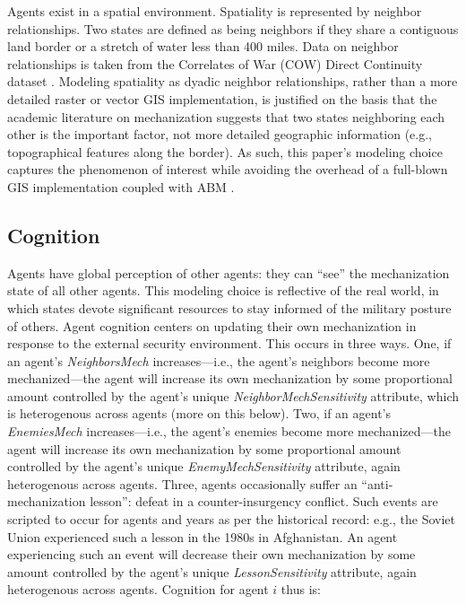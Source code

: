 \documentclass{article}
\begin{document}
Agents exist in a spatial environment. Spatiality is represented by neighbor
relationships. Two states are defined as
being neighbors if they share a contiguous land border or a stretch of water
less than 400 miles. Data on neighbor relationships is taken from the Correlates
of War (COW) Direct Continuity dataset \citep{cow_contiguity}.
Modeling spatiality as dyadic neighbor relationships, rather than a more
detailed raster or vector GIS implementation, is justified on the basis that the
academic literature on mechanization suggests that two states neighboring each
other is the important factor, not more detailed geographic information (e.g.,
topographical features along the border). As such, this paper's modeling choice
captures the phenomenon of interest while avoiding the overhead of a full-blown
GIS implementation coupled with ABM \citep[e.g.][]{harper2002modeling,bennett2006modelling}.

\subsection{Cognition}

Agents have global perception of other agents: they can ``see'' the
mechanization state of all other agents. This modeling choice is reflective of
the real world, in which states devote significant resources to stay informed of
the military posture of others. Agent cognition centers on 
updating their own mechanization in response to the external security
environment. This occurs in three ways. One, if an agent's
\textit{NeighborsMech} increases---i.e., the agent's neighbors become more
mechanized---the agent will increase its own mechanization by some proportional
amount controlled by the agent's unique \textit{NeighborMechSensitivity}
attribute, which is heterogenous across agents (more on this below).
Two, if an agent's
\textit{EnemiesMech} increases---i.e., the agent's enemies become more
mechanized---the agent will increase its own mechanization by some proportional
amount controlled by the agent's unique \textit{EnemyMechSensitivity} attribute,
again heterogenous across agents. Three,
agents occasionally suffer an ``anti-mechanization lesson'': defeat in a
counter-insurgency conflict. Such events are scripted to occur for agents and
years as per the historical record: e.g., the Soviet Union experienced such a
lesson in the 1980s in Afghanistan. An agent experiencing such an event will
decrease their own mechanization by some amount controlled by the agent's
unique \textit{LessonSensitivity} attribute, again heterogenous across agents.
Cognition for agent $i$ thus is:
\end{document}
